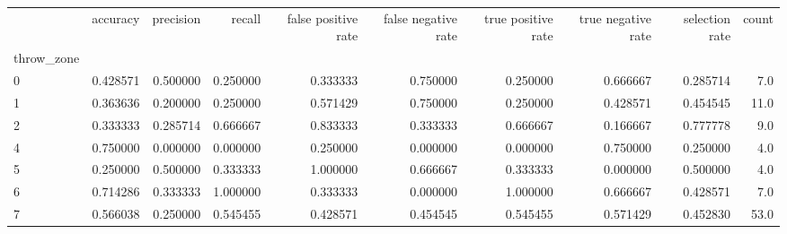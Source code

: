 \begin{tabular}{lrrrrrrrrr}
\toprule
{} &  accuracy &  precision &    recall &  false positive rate &  false negative rate &  true positive rate &  true negative rate &  selection rate &  count \\
throw\_zone &           &            &           &                      &                      &                     &                     &                 &        \\
\midrule
0          &  0.428571 &   0.500000 &  0.250000 &             0.333333 &             0.750000 &            0.250000 &            0.666667 &        0.285714 &    7.0 \\
1          &  0.363636 &   0.200000 &  0.250000 &             0.571429 &             0.750000 &            0.250000 &            0.428571 &        0.454545 &   11.0 \\
2          &  0.333333 &   0.285714 &  0.666667 &             0.833333 &             0.333333 &            0.666667 &            0.166667 &        0.777778 &    9.0 \\
4          &  0.750000 &   0.000000 &  0.000000 &             0.250000 &             0.000000 &            0.000000 &            0.750000 &        0.250000 &    4.0 \\
5          &  0.250000 &   0.500000 &  0.333333 &             1.000000 &             0.666667 &            0.333333 &            0.000000 &        0.500000 &    4.0 \\
6          &  0.714286 &   0.333333 &  1.000000 &             0.333333 &             0.000000 &            1.000000 &            0.666667 &        0.428571 &    7.0 \\
7          &  0.566038 &   0.250000 &  0.545455 &             0.428571 &             0.454545 &            0.545455 &            0.571429 &        0.452830 &   53.0 \\
\bottomrule
\end{tabular}
